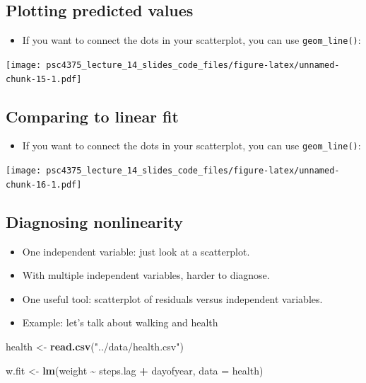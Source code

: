 \documentclass[
]{article}
\newenvironment{Shaded}{\begin{snugshade}}{\end{snugshade}}
\newcommand{\AttributeTok}[1]{\textcolor[rgb]{0.13,0.29,0.53}{#1}}
\newcommand{\FunctionTok}[1]{\textcolor[rgb]{0.13,0.29,0.53}{\textbf{#1}}}
\newcommand{\NormalTok}[1]{#1}
\newcommand{\OtherTok}[1]{\textcolor[rgb]{0.56,0.35,0.01}{#1}}
\newcommand{\SpecialCharTok}[1]{\textcolor[rgb]{0.81,0.36,0.00}{\textbf{#1}}}
\newcommand{\StringTok}[1]{\textcolor[rgb]{0.31,0.60,0.02}{#1}}
\providecommand{\tightlist}{%
  \setlength{\itemsep}{0pt}\setlength{\parskip}{0pt}}
\begin{document}
\subsection{Plotting predicted
values}\label{plotting-predicted-values-1}

\begin{itemize}
\tightlist
\item
  If you want to connect the dots in your scatterplot, you can use
  \texttt{geom\_line()}:
\end{itemize}

\texttt{[image: psc4375\_lecture\_14\_slides\_code\_files/figure-latex/unnamed-chunk-15-1.pdf]}

\subsection{Comparing to linear fit}\label{comparing-to-linear-fit}

\begin{itemize}
\tightlist
\item
  If you want to connect the dots in your scatterplot, you can use
  \texttt{geom\_line()}:
\end{itemize}

\texttt{[image: psc4375\_lecture\_14\_slides\_code\_files/figure-latex/unnamed-chunk-16-1.pdf]}

\subsection{Diagnosing nonlinearity}\label{diagnosing-nonlinearity}

\begin{itemize}
\tightlist
\item
  One independent variable: just look at a scatterplot.
\item
  With multiple independent variables, harder to diagnose.
\item
  One useful tool: scatterplot of residuals versus independent
  variables.
\item
  Example: let's talk about walking and health
\end{itemize}

\begin{Shaded}
\begin{Highlighting}[]
\NormalTok{health }\OtherTok{\textless{}{-}} \FunctionTok{read.csv}\NormalTok{(}\StringTok{"../data/health.csv"}\NormalTok{)}

\NormalTok{w.fit }\OtherTok{\textless{}{-}} \FunctionTok{lm}\NormalTok{(weight }\SpecialCharTok{\textasciitilde{}}\NormalTok{  steps.lag }\SpecialCharTok{+}\NormalTok{ dayofyear, }\AttributeTok{data =}\NormalTok{ health)}
\end{Highlighting}
\end{Shaded}
\end{document}
